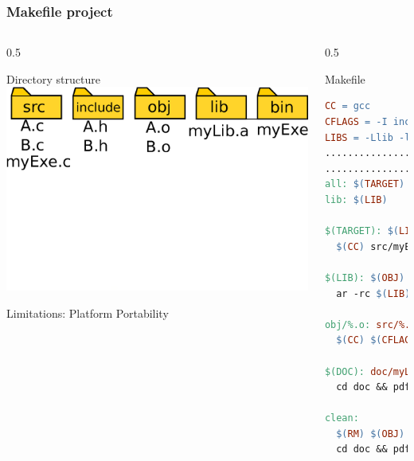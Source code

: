 \documentclass{beamer}
\begin{document}
\begin{frame}[fragile] \frametitle{Makefile project}
  \begin{columns}
    \begin{column}{0.5\textwidth}
      \begin{block}{Directory  structure}
        \includegraphics[width=\textwidth]{dir_all}
      \end{block}
        \begin{block}{Limitations:}
          \centering
          Platform  Portability 
        \end{block} 
    \end{column}
    \begin{column}{0.5\textwidth}
      \begin{block}{Makefile}
        \tiny{\begin{lstlisting}[language=make]
CC = gcc 
CFLAGS = -I include -g -Wall -O2
LIBS = -Llib -lmyLib
................
...............
all: $(TARGET)
lib: $(LIB)

$(TARGET): $(LIB) src/myExe.c
  $(CC) src/myExe.c  $(CFLAGS) $(LIBS) -o $@

$(LIB): $(OBJ)
  ar -rc $(LIB) $(OBJ)

obj/%.o: src/%.c
  $(CC) $(CFLAGS)  -c $< -o $@

$(DOC): doc/myLib.tex
  cd doc && pdflatex -pdf myLib.tex

clean:
  $(RM) $(OBJ) $(TARGET) 
  cd doc && pdflatex -c myLib.tex
            \end{lstlisting}
        }
      \end{block}
    \end{column}
  \end{columns}
\end{frame}
\end{document}
